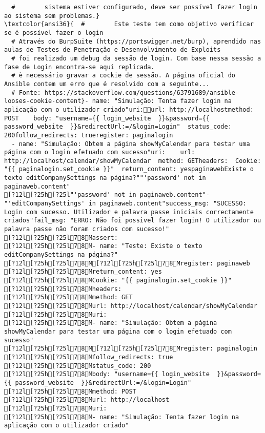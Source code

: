 \documentclass{scrartcl}
\begin{document}
\begin{Verbatim}
  #        sistema estiver configurado, deve ser possível fazer login ao sistema sem problemas.}
\textcolor{ansi36}{  #        Este teste tem como objetivo verificar se é possível fazer o login
  # Através do BurpSuite (https://portswigger.net/burp), aprendido nas aulas de Testes de Penetração e Desenvolvimento de Exploits
  # foi realizado um debug da sessão de login. Com base nessa sessão a fase de Login encontra-se aqui replicada.
  # è necessário gravar a cockie de sessão. A página oficial do Ansible contem um erro que é resolvido com a seguinte...
  # Fonte: https://stackoverflow.com/questions/63791689/ansible-looses-cookie-content}- name: "Simulação: Tenta fazer login na aplicação com o utilizador criado"uri:url: http://localhostmethod: POST    body: "username={{ login_website  }}&password={{ password_website  }}&redirectUrl:=/&login=Login"  status_code: 200follow_redirects: trueregister: paginalogin
  - name: "Simulação: Obtem a página showMyCalendar para testar uma página com o login efetuado com sucesso"uri:    url: http://localhost/calendar/showMyCalendar  method: GETheaders:  Cookie: "{{ paginalogin.set_cookie }}"  return_content: yespaginawebExiste o texto editCompanySettings na página?""'password' not in paginaweb.content"
[?12l[?25h[?25l"'password' not in paginaweb.content"- "'editCompanySettings' in paginaweb.content"success_msg: "SUCESSO: Login com sucesso. Utilizador e palavra passe iniciais correctamente criados"fail_msg: "ERRO: Não foi possivel fazer login! O utilizador ou palavra passe não foram criados com sucesso!"
[?12l[?25h[?25l78Massert:
[?12l[?25h[?25l78M- name: "Teste: Existe o texto editCompanySettings na página?"
[?12l[?25h[?25l78M[?12l[?25h[?25l78Mregister: paginaweb
[?12l[?25h[?25l78Mreturn_content: yes
[?12l[?25h[?25l78MCookie: "{{ paginalogin.set_cookie }}"
[?12l[?25h[?25l78Mheaders:
[?12l[?25h[?25l78Mmethod: GET
[?12l[?25h[?25l78Murl: http://localhost/calendar/showMyCalendar
[?12l[?25h[?25l78Muri:
[?12l[?25h[?25l78M- name: "Simulação: Obtem a página showMyCalendar para testar uma página com o login efetuado com sucesso"
[?12l[?25h[?25l78M[?12l[?25h[?25l78Mregister: paginalogin
[?12l[?25h[?25l78Mfollow_redirects: true
[?12l[?25h[?25l78Mstatus_code: 200
[?12l[?25h[?25l78Mbody: "username={{ login_website  }}&password={{ password_website  }}&redirectUrl:=/&login=Login"
[?12l[?25h[?25l78Mmethod: POST
[?12l[?25h[?25l78Murl: http://localhost
[?12l[?25h[?25l78Muri:
[?12l[?25h[?25l78M- name: "Simulação: Tenta fazer login na aplicação com o utilizador criado"

\end{Verbatim}
\end{document}
